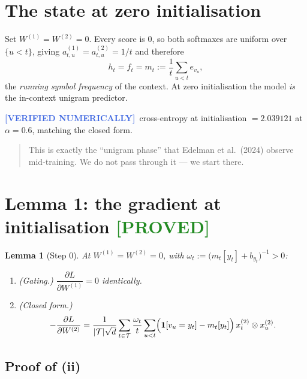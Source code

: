 \documentclass[11pt,a4paper]{article}
\theoremstyle{plain}
\newtheorem{lemma}{Lemma}
\theoremstyle{definition}
\newcommand{\PROVED}{\textcolor{ForestGreen}{\textbf{[PROVED]}}}
\newcommand{\NUM}{\textcolor{RoyalBlue}{\textbf{[VERIFIED NUMERICALLY]}}}
\newcommand{\Win}{\mathcal{T}}
\newcommand{\1}{\mathbf{1}}
\begin{document}
\section{The state at zero initialisation}

Set $W^{(1)}=W^{(2)}=0$. Every score is $0$, so both softmaxes are uniform over $\{u<t\}$, giving
$a^{(1)}_{t,u}=a^{(2)}_{t,u}=1/t$ and therefore
\begin{equation}
h_t=f_t=m_t:=\frac1t\sum_{u<t}e_{v_u},
\end{equation}
the \emph{running symbol frequency} of the context. At zero initialisation the model \emph{is} the
in-context unigram predictor.

\medskip\noindent\NUM\ cross-entropy at initialisation $=2.039121$ at $\alpha=0.6$, matching the
closed form.

\begin{quote}
This is exactly the ``unigram phase'' that Edelman et al.\ (2024) observe mid-training. We do not
pass through it --- we start there.
\end{quote}

\section{Lemma 1: the gradient at initialisation \quad \PROVED}

\begin{lemma}[Step $0$]\label{lem:step0}
At $W^{(1)}=W^{(2)}=0$, with $\omega_t:=\bigl(m_t[y_t]+b_{y_t}\bigr)^{-1}>0$:
\begin{enumerate}[label=(\roman*),nosep]
\item \textup{(Gating.)} $\dfrac{\partial L}{\partial W^{(1)}}=0$ identically.
\item \textup{(Closed form.)}
\begin{equation}\label{eq:g2}
-\frac{\partial L}{\partial W^{(2)}}
=\frac{1}{|\Win|\sqrt d}\sum_{t\in\Win}\frac{\omega_t}{t}
\sum_{u<t}\Bigl(\1[v_u=y_t]-m_t[y_t]\Bigr)\,x^{(2)}_t\otimes x^{(2)}_u .
\end{equation}
\end{enumerate}
\end{lemma}

\subsection{Proof of (ii)}
\end{document}
